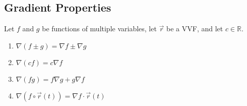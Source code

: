 \subsection{Gradient Properties}
\noindent
Let $f$ and $g$ be functions of multiple variables, let $\vec{r}$ be a VVF, and let $c\in\mathbb{R}$.
\begin{enumerate}
	\item $\nabla(f\pm g)=\nabla f\pm\nabla g$
	\item $\nabla(cf)=c\nabla f$
	\item $\nabla(fg)=f\nabla g+g\nabla f$
	\item $\nabla(f\circ\vec{r}(t))=\nabla f\cdot\vec{r}(t)$
\end{enumerate}